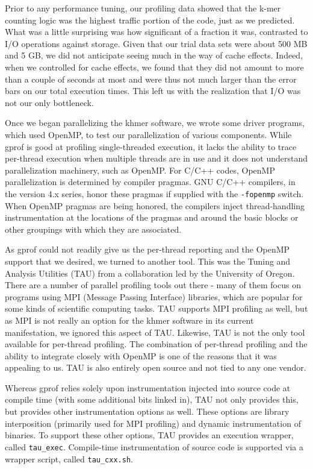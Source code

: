 \documentclass{article}
\begin{document}
Prior to any performance tuning, our profiling data showed that the k-mer counting logic was the highest traffic portion of the code, just as we predicted. What was a little surprising was how significant of a fraction it was, contrasted to I/O operations against storage. Given that our trial data sets were about 500 MB and 5 GB, we did not anticipate seeing much in the way of cache effects. Indeed, when we controlled for cache effects, we found that they did not amount to more than a couple of seconds at most and were thus not much larger than the error bars on our total execution times. This left us with the realization that I/O was not our only bottleneck.

Once we began parallelizing the khmer software, we wrote some driver programs, which used OpenMP, to test our parallelization of various components. While gprof is good at profiling single-threaded execution, it lacks the ability to trace per-thread execution when multiple threads are in use and it does not understand parallelization machinery, such as OpenMP. For C/C++ codes, OpenMP parallelization is determined by compiler pragmas. GNU C/C++ compilers, in the version 4.x series, honor these pragmas if supplied with the \texttt{-fopenmp} switch. When OpenMP pragmas are being honored, the compilers inject thread-handling instrumentation at the locations of the pragmas and around the basic blocks or other groupings with which they are associated.

As gprof could not readily give us the per-thread reporting and the OpenMP support that we desired, we turned to another tool. This was the Tuning and Analysis Utilities (TAU) from a collaboration led by the University of Oregon. There are a number of parallel profiling tools out there - many of them focus on programs using MPI (Message Passing Interface) libraries, which are popular for some kinds of scientific computing tasks. TAU supports MPI profiling as well, but as MPI is not really an option for the khmer software in its current manifestation, we ignored this aspect of TAU. Likewise, TAU is not the only tool available for per-thread profiling. The combination of per-thread profiling and the ability to integrate closely with OpenMP is one of the reasons that it was appealing to us. TAU is also entirely open source and not tied to any one vendor.

Whereas gprof relies solely upon instrumentation injected into source code at compile time (with some additional bits linked in), TAU not only provides this, but provides other instrumentation options as well. These options are library interposition (primarily used for MPI profiling) and dynamic instrumentation of binaries. To support these other options, TAU provides an execution wrapper, called \texttt{tau\_exec}. Compile-time instrumentation of source code is supported via a wrapper script, called \texttt{tau\_cxx.sh}.
\end{document}
